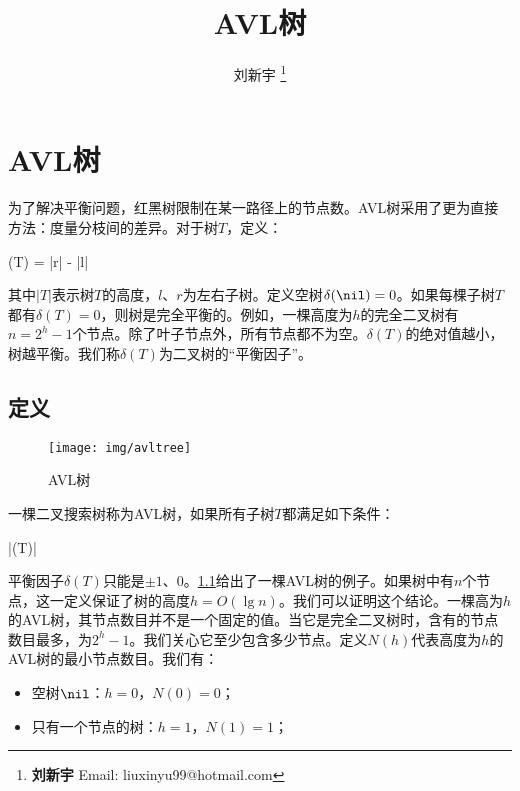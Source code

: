 \documentclass[b5paper]{ctexart}
\begin{document}
\title{AVL树}

\author{刘新宇
\thanks{{\bfseries 刘新宇} \newline
  Email: liuxinyu99@hotmail.com \newline}
  }

\maketitle
\fi


\ifx\wholebook\relax
\chapter{AVL树}
\fi

\label{introduction} 

为了解决平衡问题，红黑树限制在某一路径上的节点数。AVL树采用了更为直接方法：度量分枝间的差异。对于树$T$，定义：

\be
  \delta(T) = |r| - |l|
\ee

其中$|T|$表示树$T$的高度，$l$、$r$为左右子树。定义空树$\delta(\nil) = 0$。如果每棵子树$T$都有$\delta(T) = 0$，则树是完全平衡的。例如，一棵高度为$h$的完全二叉树有$n = 2^h - 1$个节点。除了叶子节点外，所有节点都不为空。$\delta(T)$的绝对值越小，树越平衡。我们称$\delta(T)$为二叉树的“平衡因子”。

\section{定义}

\begin{figure}[htbp]
   \centering
   \texttt{[image: img/avltree]}
   \caption{AVL树} \label{fig:avl-example}
\end{figure}

一棵二叉搜索树称为AVL树，如果所有子树$T$都满足如下条件：

\be
  |\delta(T)| 
  \label{eq:avl-rule}
\ee

平衡因子$\delta(T)$只能是$\pm 1$、0。\cref{fig:avl-example}给出了一棵AVL树的例子。如果树中有$n$个节点，这一定义保证了树的高度$h = O(\lg n)$。我们可以证明这个结论。一棵高为$h$的AVL树，其节点数目并不是一个固定的值。当它是完全二叉树时，含有的节点数目最多，为$2^h - 1$。我们关心它至少包含多少节点。定义$N(h)$代表高度为$h$的AVL树的最小节点数目。我们有：

\begin{itemize}
\item 空树$\nil$：$h = 0$，$N(0) = 0$；
\item 只有一个节点的树：$h = 1$，$N(1) = 1$；
\end{itemize}
\end{document}
